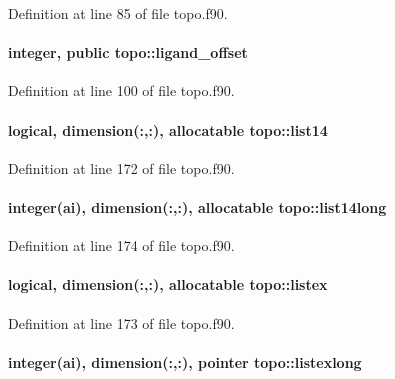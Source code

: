Definition at line 85 of file topo.\-f90.

\hypertarget{classtopo_a8ea821d57105dc97b563aefc43d99d60}{
\paragraph[{ligand\-\_\-offset}]{\setlength{\rightskip}{0pt plus 5cm}integer, public topo\-::ligand\-\_\-offset}}\label{classtopo_a8ea821d57105dc97b563aefc43d99d60}


Definition at line 100 of file topo.\-f90.

\hypertarget{classtopo_a696c4dfe06f913854120360cf5e906d0}{
\paragraph[{list14}]{\setlength{\rightskip}{0pt plus 5cm}logical, dimension(\-:,\-:), allocatable topo\-::list14}}\label{classtopo_a696c4dfe06f913854120360cf5e906d0}


Definition at line 172 of file topo.\-f90.

\hypertarget{classtopo_a195827534980f9002caf554cc449bdfd}{
\paragraph[{list14long}]{\setlength{\rightskip}{0pt plus 5cm}integer(ai), dimension(\-:,\-:), allocatable topo\-::list14long}}\label{classtopo_a195827534980f9002caf554cc449bdfd}


Definition at line 174 of file topo.\-f90.

\hypertarget{classtopo_a830745f1b19366ecd19740718c30a2a0}{
\paragraph[{listex}]{\setlength{\rightskip}{0pt plus 5cm}logical, dimension(\-:,\-:), allocatable topo\-::listex}}\label{classtopo_a830745f1b19366ecd19740718c30a2a0}


Definition at line 173 of file topo.\-f90.

\hypertarget{classtopo_ab6d13bd20fd204e5d5dac827e8d2f0d8}{
\paragraph[{listexlong}]{\setlength{\rightskip}{0pt plus 5cm}integer(ai), dimension(\-:,\-:), pointer topo\-::listexlong}}\label{classtopo_ab6d13bd20fd204e5d5dac827e8d2f0d8}


